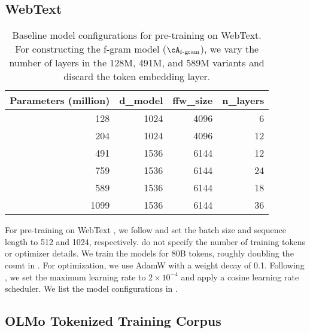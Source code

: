 \subsection{WebText}
\label{subsec:webtext_details}

\begin{table}[h]
    \centering
    \begin{tabular}{r|r r r}
        \toprule
        \textbf{Parameters (million)} & \textbf{d\_model} & \textbf{ffw\_size} & \textbf{n\_layers} \\
        \midrule
        128  & 1024  & 4096  & 6   \\
        204  & 1024  & 4096  & 12     \\
        491  & 1536  & 6144  & 12     \\
        759  & 1536  & 6144  & 24     \\
        589  & 1536  & 6144  & 18     \\
        1099  & 1536  & 6144  & 36    \\
        \bottomrule
    \end{tabular}
    \caption{Baseline model configurations for pre-training on WebText. For constructing the f-gram model ($\Afgram$), we vary the number of layers in the 128M, 491M, and 589M variants and discard the token embedding layer.}
    \label{tab:webtext_model_configs}
\end{table}


For pre-training on WebText \citep{openwebtext}, we follow \citet{radford2019language} and set the batch size and sequence length to 512 and 1024, respectively. \citet{radford2019language} do not specify the number of training tokens or optimizer details. We train the models for 80B tokens, roughly doubling the count in \citet{radford2018improving}. For optimization, we use AdamW \citep{loshchilov2017decoupled} with a weight decay of 0.1. Following \citet{hoffmann2022training}, we set the maximum learning rate to $2\times 10^{-4}$ and apply a cosine learning rate scheduler. We list the model configurations in .



\subsection{OLMo Tokenized Training Corpus}
\label{subsec:dolma_details}

